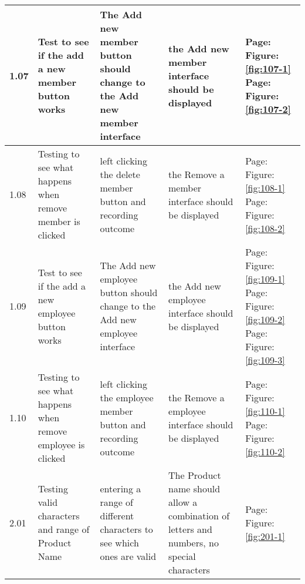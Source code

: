 \begin{flushleft}
\begin{longtable}{|p{1cm}|p{2.5cm}|p{2.5cm}|p{2cm}|p{2cm}|}
	1.07 & Test to see if the add a new member button works & The Add new member button should change to the Add new member interface & the Add new member interface should be displayed&  Page:\pageref{fig:107-1}  \newline Figure:\ref{fig:107-1} \newline  \newline Page:\pageref{fig:107-2}  \newline Figure:\ref{fig:107-2}\\ \hline
	1.08 & Testing to see what happens when remove member is clicked & left clicking the delete member button and recording outcome & the Remove a member interface should be displayed &  Page:\pageref{fig:108-1}  \newline Figure:\ref{fig:108-1} \newline  \newline Page:\pageref{fig:108-2}  \newline Figure:\ref{fig:108-2}\\ \hline
	1.09 & Test to see if the add a new employee button works & The Add new employee button should change to the Add new employee interface &  the Add new employee interface should be displayed&   Page:\pageref{fig:109-1}  \newline Figure:\ref{fig:109-1} \newline  \newline Page:\pageref{fig:109-2}  \newline Figure:\ref{fig:109-2} \newline  \newline  Page:\pageref{fig:109-3}  \newline Figure:\ref{fig:109-3}\\ \hline
	1.10 & Testing to see what happens when remove employee is clicked & left clicking the employee member button and recording outcome & the Remove a employee interface should be displayed &  Page:\pageref{fig:110-1}  \newline Figure:\ref{fig:110-1}  \newline  \newline Page:\pageref{fig:110-2}  \newline Figure:\ref{fig:110-2}\\ \hline
	2.01 & Testing valid characters and range of Product Name & entering a range of different characters to see which ones are valid & The Product name should allow a combination of letters and numbers, no special characters & Page:\pageref{fig:201-1}  \newline Figure:\ref{fig:201-1}  \newline  \newline

\end{longtable}
\end{flushleft}

